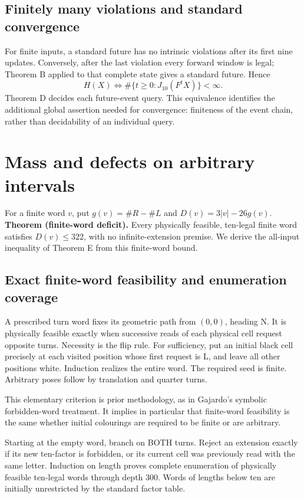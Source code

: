 \documentclass[
  11pt,
]{article}
\begin{document}
\subsection{Finitely many violations and standard
convergence}\label{finitely-many-violations-and-standard-convergence}

For finite inputs, a standard future has no intrinsic violations after
its first nine updates. Conversely, after the last violation every
forward window is legal; Theorem B applied to that complete state gives
a standard future. Hence \[H(X)\iff \#\{t\ge0:J_{10}(F^tX)\}<\infty.\]
Theorem D decides each future-event query. This equivalence identifies
the additional global assertion needed for convergence: finiteness of
the event chain, rather than decidability of an individual query.

\section{Mass and defects on arbitrary
intervals}\label{mass-and-defects-on-arbitrary-intervals}

For a finite word \(v\), put \(g(v)=\#R-\#L\) and \(D(v)=3|v|-26g(v)\).
\textbf{Theorem (finite-word deficit).} Every physically feasible,
ten-legal finite word satisfies \(D(v)\le322\), with no
infinite-extension premise. We derive the all-input inequality of Theorem E from this finite-word
bound.

\subsection{Exact finite-word feasibility and enumeration
coverage}\label{mass-2}

A prescribed turn word fixes its geometric path from $(0,0)$, heading N. It is
physically feasible exactly when successive reads of each physical cell
request opposite turns. Necessity is the flip rule. For sufficiency, put
an initial black cell precisely at each visited position whose first
request is L, and leave all other positions white. Induction realizes
the entire word. The required seed is finite. Arbitrary poses follow by
translation and quarter turns.

This elementary criterion is prior methodology, as in Gajardo's symbolic
forbidden-word treatment. It implies in
particular that finite-word feasibility is the same whether initial
colourings are required to be finite or are arbitrary.

Starting at the empty word, branch on BOTH turns. Reject an extension
exactly if its new ten-factor is forbidden, or its current cell was
previously read with the same letter. Induction on length proves
complete enumeration of physically feasible ten-legal words through
depth 300. Words of lengths below ten are initially unrestricted by
the standard factor table.
\end{document}
